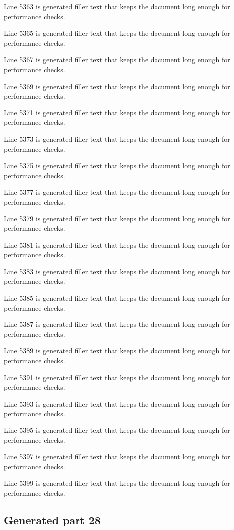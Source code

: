 Line 5363 is generated filler text that keeps the document long enough for performance checks.

Line 5365 is generated filler text that keeps the document long enough for performance checks.

Line 5367 is generated filler text that keeps the document long enough for performance checks.

Line 5369 is generated filler text that keeps the document long enough for performance checks.

Line 5371 is generated filler text that keeps the document long enough for performance checks.

Line 5373 is generated filler text that keeps the document long enough for performance checks.

Line 5375 is generated filler text that keeps the document long enough for performance checks.

Line 5377 is generated filler text that keeps the document long enough for performance checks.

Line 5379 is generated filler text that keeps the document long enough for performance checks.

Line 5381 is generated filler text that keeps the document long enough for performance checks.

Line 5383 is generated filler text that keeps the document long enough for performance checks.

Line 5385 is generated filler text that keeps the document long enough for performance checks.

Line 5387 is generated filler text that keeps the document long enough for performance checks.

Line 5389 is generated filler text that keeps the document long enough for performance checks.

Line 5391 is generated filler text that keeps the document long enough for performance checks.

Line 5393 is generated filler text that keeps the document long enough for performance checks.

Line 5395 is generated filler text that keeps the document long enough for performance checks.

Line 5397 is generated filler text that keeps the document long enough for performance checks.

Line 5399 is generated filler text that keeps the document long enough for performance checks.

\subsection{Generated part 28}

